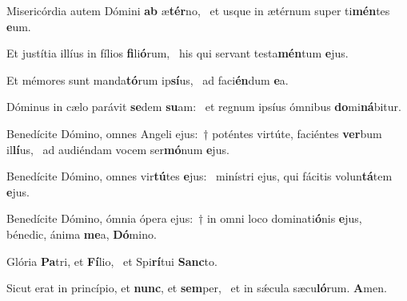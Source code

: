 \item Misericórdia autem Dómini \textbf{ab} æ\textbf{tér}no,~\psstar{} et usque in ætérnum super ti\textbf{mén}tes \textbf{e}um.
\item Et justítia illíus in fílios \textbf{fi}li\textbf{ó}rum,~\psstar{} his qui servant testa\textbf{mén}tum \textbf{e}jus.
\item Et mémores sunt manda\textbf{tó}rum ip\textbf{sí}us,~\psstar{} ad faci\textbf{én}dum \textbf{e}a.
\item Dóminus in cælo parávit \textbf{se}dem \textbf{su}am:~\psstar{} et regnum ipsíus ómnibus \textbf{do}mi\textbf{ná}bitur.
\item Benedícite Dómino, omnes Angeli ejus:~† poténtes virtúte, faciéntes \textbf{ver}bum il\textbf{lí}us,~\psstar{} ad audiéndam vocem ser\textbf{mó}num \textbf{e}jus.
\item Benedícite Dómino, omnes vir\textbf{tú}tes \textbf{e}jus:~\psstar{} minístri ejus, qui fácitis volun\textbf{tá}tem \textbf{e}jus.
\item Benedícite Dómino, ómnia ópera ejus:~† in omni loco dominati\textbf{ó}nis \textbf{e}jus,~\psstar{} bénedic, ánima \textbf{me}a, \textbf{Dó}mino.
\item Glória \textbf{Pa}tri, et \textbf{Fí}lio,~\psstar{} et Spi\textbf{rí}tui \textbf{Sanc}to.
\item Sicut erat in princípio, et \textbf{nunc}, et \textbf{sem}per,~\psstar{} et in sǽcula sæcu\textbf{ló}rum. \textbf{A}men.
